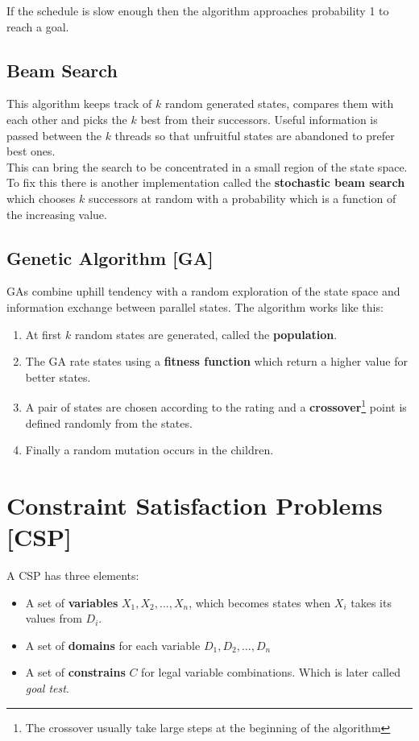 \documentclass[10pt,a4paper]{article}
\begin{document}
If the schedule is slow enough then the algorithm approaches probability 1 to reach a goal. 

\subsection{Beam Search}
This algorithm keeps track of $k$ random generated states, compares them with each other and picks the $k$ best from their successors. Useful information is passed between the $k$ threads so that unfruitful states are abandoned to prefer best ones.\\
 This can bring the search to be concentrated in a small region of the state space. To fix this there is another implementation called the \textbf{stochastic beam search} which chooses $k$ successors at random with a probability which is a function of the increasing value.
 
\subsection{Genetic Algorithm [GA]}
GAs combine uphill tendency with a random exploration of the state space and information exchange between parallel states. The algorithm works like this:
\begin{enumerate}
\item At first $k$ random states are generated, called the \textbf{population}.
\item The GA rate states using a \textbf{fitness function} which return a higher value for better states.
\item A pair of states are chosen according to the rating and a \textbf{crossover}\footnote{The crossover usually take large steps at the beginning of the algorithm } point is defined randomly from the states.
\item Finally a random mutation occurs in the children.
\end{enumerate}



\newpage

\section{Constraint Satisfaction Problems [CSP]}
A CSP has three elements:
\begin{itemize}
\item A set of \textbf{variables} ${X_1,X_2,...,X_n}$, which becomes states when $X_i$ takes its values from $D_i$.
\item A set of \textbf{domains} for each variable ${D_1,D_2,...,D_n}$
\item A set of \textbf{constrains} $C$ for legal variable combinations. Which is later called \textit{goal test}.
\end{itemize}
\end{document}

